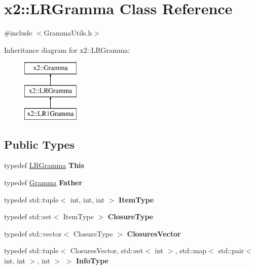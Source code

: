 \hypertarget{classx2_1_1_l_r_gramma}{}\section{x2\+:\+:L\+R\+Gramma Class Reference}
\label{classx2_1_1_l_r_gramma}


{\ttfamily \#include $<$Gramma\+Utils.\+h$>$}

Inheritance diagram for x2\+:\+:L\+R\+Gramma\+:\begin{figure}[H]
\begin{center}
\leavevmode
\includegraphics[height=3.000000cm]{classx2_1_1_l_r_gramma}
\end{center}
\end{figure}
\subsection*{Public Types}
\begin{DoxyCompactItemize}
\item 
\mbox{\label{classx2_1_1_l_r_gramma_a71192f7005e3f0369414c888a73be237}} 
typedef \hyperlink{classx2_1_1_l_r_gramma}{L\+R\+Gramma} {\bfseries This}
\item 
\mbox{\label{classx2_1_1_l_r_gramma_a4841e95ceda2580dcb28924cde7eccf3}} 
typedef \hyperlink{classx2_1_1_gramma}{Gramma} {\bfseries Father}
\item 
\mbox{\label{classx2_1_1_l_r_gramma_ad6ec096bc4670fccd2e4778314d2e0cb}} 
typedef std\+::tuple$<$ int, int, int $>$ {\bfseries Item\+Type}
\item 
\mbox{\label{classx2_1_1_l_r_gramma_a8df1989466f03aecabd14ec34ba6433b}} 
typedef std\+::set$<$ Item\+Type $>$ {\bfseries Closure\+Type}
\item 
\mbox{\label{classx2_1_1_l_r_gramma_a5d21d307296ccff26e15c9e0b1c13dfb}} 
typedef std\+::vector$<$ Closure\+Type $>$ {\bfseries Closures\+Vector}
\item 
\mbox{\label{classx2_1_1_l_r_gramma_a5622c230cf16f9def37f4b61c7db4c20}} 
typedef std\+::tuple$<$ Closures\+Vector, std\+::set$<$ int $>$, std\+::map$<$ std\+::pair$<$ int, int $>$, int $>$ $>$ {\bfseries Info\+Type}
\end{DoxyCompactItemize}
